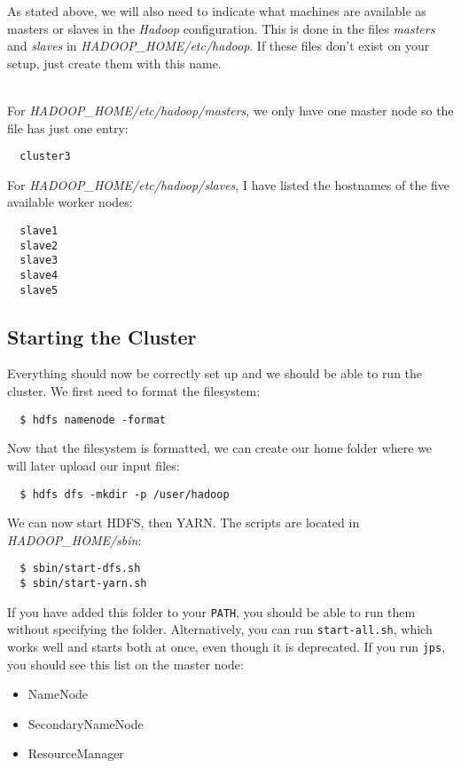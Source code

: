 \documentclass[a4paper, 12pt]{article}
\begin{document}
As stated above, we will also need to indicate what machines are available as masters or slaves in the \textit{Hadoop} configuration. This is done in the files \textit{masters} and \textit{slaves} in \textit{HADOOP\_HOME/etc/hadoop}. If these files don't exist on your setup, just create them with this name.

~\\
For \textit{HADOOP\_HOME/etc/hadoop/masters}, we only have one master node so the file has just one entry:

\begin{verbatim}
  cluster3
\end{verbatim}

For \textit{HADOOP\_HOME/etc/hadoop/slaves}, I have listed the hostnames of the five available worker nodes:

\begin{verbatim}
  slave1
  slave2
  slave3
  slave4
  slave5
\end{verbatim}

  \subsection{Starting the Cluster}
  
Everything should now be correctly set up and we should be able to run the cluster. We first need to format the filesystem:

\begin{verbatim}
  $ hdfs namenode -format
\end{verbatim}

Now that the filesystem is formatted, we can create our home folder where we will later upload our input files:

\begin{verbatim}
  $ hdfs dfs -mkdir -p /user/hadoop
\end{verbatim}

We can now start HDFS, then YARN. The scripts are located in \textit{HADOOP\_HOME/sbin}:

\begin{verbatim}
  $ sbin/start-dfs.sh
  $ sbin/start-yarn.sh
\end{verbatim}

If you have added this folder to your \texttt{PATH}, you should be able to run them without specifying the folder. Alternatively, you can run \texttt{start-all.sh}, which works well and starts both at once, even though it is deprecated. If you run \texttt{jps}, you should see this list on the master node:
\begin{itemize}
  \item NameNode
  \item SecondaryNameNode
  \item ResourceManager
\end{itemize}
\end{document}
